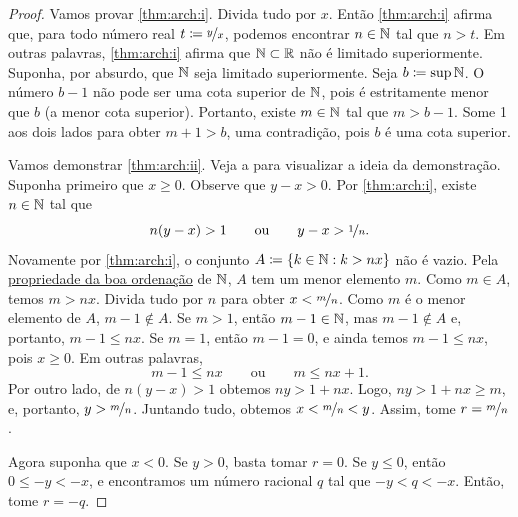\begin{proof}
Vamos provar \ref{thm:arch:i}. Divida tudo por $x$.
Então \ref{thm:arch:i} afirma que, para todo número real $t\coloneqq \nicefrac{y}{x}$,
podemos encontrar $n \in {\mathbb{N}}$ tal que $n > t$. Em outras palavras,
\ref{thm:arch:i} afirma que ${\mathbb{N}} \subset {\mathbb{R}}$ não é limitado superiormente.
Suponha, por absurdo, que ${\mathbb{N}}$ seja limitado superiormente. Seja $b \coloneqq \sup {\mathbb{N}}$.
O número $b-1$ não pode ser uma cota superior de ${\mathbb{N}}$, pois é estritamente
menor que $b$ (a menor cota superior). Portanto, existe $m \in {\mathbb{N}}$ tal que $m > b-1$.
Some 1 aos dois lados para obter $m+1 > b$, uma contradição, pois $b$ é uma
cota superior.

\begin{myfigureht}
\caption{Ideia da demonstração da densidade de $\Q$: encontre $n$ tal que $y-x >
\nicefrac{1}{n}$ e, em seguida, tome o menor $m$ tal que $\nicefrac{m}{n} > x$.\label{figdensofQ}}
\end{myfigureht}
Vamos demonstrar \ref{thm:arch:ii}.
Veja a 
para visualizar a ideia da demonstração.
Suponha primeiro que $x \geq 0$.
Observe que $y-x > 0$.
Por \ref{thm:arch:i}, existe $n \in {\mathbb{N}}$ tal que
\begin{equation*}
n(y-x) > 1
\qquad \text{ou} \qquad
y-x > \nicefrac{1}{n}.
\end{equation*}
Novamente por \ref{thm:arch:i}, o conjunto
$A \coloneqq \{ k \in {\mathbb{N}} : k > nx \}$ não é vazio. Pela
\hyperlink{wop:link}{propriedade da boa ordenação}
de ${\mathbb{N}}$, $A$ tem um menor elemento $m$.
Como $m \in A$, temos $m > nx$.
Divida tudo por $n$ para obter $x < \nicefrac{m}{n}$.
Como $m$ é o menor
elemento de $A$, $m-1 \notin A$.
Se $m > 1$, então $m-1 \in {\mathbb{N}}$, mas $m-1 \notin A$ e, portanto, $m-1 \leq nx$.
Se $m=1$,
então $m-1 = 0$, e ainda temos $m-1 \leq nx$, pois $x \geq 0$.
Em outras palavras,
\begin{equation*}
m-1 \leq nx \qquad \text{ou} \qquad m \leq nx+1 .
\end{equation*}
Por outro lado,
de $n(y-x) > 1$ obtemos $ny > 1+nx$.
Logo, $ny > 1+nx \geq m$, e, portanto, $y > \nicefrac{m}{n}$.
Juntando tudo, obtemos $x < \nicefrac{m}{n} < y$.
Assim, tome $r = \nicefrac{m}{n}$.

Agora suponha que $x < 0$. Se $y > 0$, basta tomar $r=0$. Se
$y \leq 0$, então $0 \leq -y < -x$, e encontramos
um número racional $q$ tal que $-y < q < -x$. Então, tome $r = -q$.
\end{proof}

